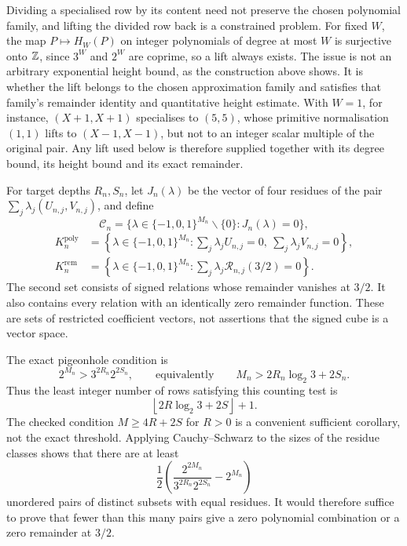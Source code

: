 \documentclass[11pt]{article}
\begin{document}
Dividing a specialised row by its content need not preserve the chosen
polynomial family, and lifting the divided row back is a constrained problem. For fixed $W$, the map $P\mapsto H_W(P)$ on integer polynomials of
degree at most $W$ is surjective onto $\mathbb{Z}$, since $3^{W}$ and $2^{W}$ are
coprime, so a lift always exists. The issue is not an arbitrary exponential
height bound, as the construction above shows. It is whether the lift
belongs to the chosen approximation family and satisfies that family's
remainder identity and quantitative height estimate. With $W=1$,
for instance, $(X+1,X+1)$ specialises to $(5,5)$, whose primitive
normalisation $(1,1)$ lifts to $(X-1,X-1)$, but not to an integer scalar
multiple of the original pair.  Any lift used below is therefore supplied together with its
degree bound, its height bound and its exact remainder.

For target depths $R_n,S_n$, let $J_n(\lambda)$ be the vector of four residues of
the pair $\sum_j\lambda_j(U_{n,j},V_{n,j})$, and define
\[
 \mathcal C_n=
 \{\lambda\in\{-1,0,1\}^{M_n}\mathbin{\backslash}\{0\}:J_n(\lambda)=0\},
\]
\[
\begin{aligned}
 K_n^{\mathrm{poly}}
   &=\left\{\lambda\in\{-1,0,1\}^{M_n}:
       \sum_j\lambda_jU_{n,j}=0,\ \sum_j\lambda_jV_{n,j}=0\right\},\\
 K_n^{\mathrm{rem}}
   &=\left\{\lambda\in\{-1,0,1\}^{M_n}:
       \sum_j\lambda_j\mathcal R_{n,j}(3/2)=0\right\}.
\end{aligned}
\]
The second set consists of signed relations whose remainder vanishes
at $3/2$. It also contains every relation with an identically zero
remainder function. These are sets of restricted coefficient vectors,
not assertions that the signed cube is a vector space.

The exact pigeonhole condition is
\begin{equation}
 2^{M_n}>3^{2R_n}2^{2S_n},
 \qquad\text{equivalently}\qquad
 M_n>2R_n\log_2 3+2S_n.
\label{long1049:eq:exact-jet-threshold}
\end{equation}
Thus the least integer number of rows satisfying this counting test is
\[
 \left\lfloor2R\log_2 3+2S\right\rfloor+1.
\]
The checked condition $M\ge4R+2S$ for $R>0$ is a convenient sufficient
corollary, not the exact threshold. Applying Cauchy--Schwarz to the
sizes of the residue classes shows that there are at least
\begin{equation}
 \frac12\left(\frac{2^{2M_n}}{3^{2R_n}2^{2S_n}}-2^{M_n}\right)
\label{long1049:eq:collision-count}
\end{equation}
unordered pairs of distinct subsets with equal residues. It would
therefore suffice to prove that fewer than this many pairs give a zero
polynomial combination or a zero remainder at $3/2$.
\end{document}

